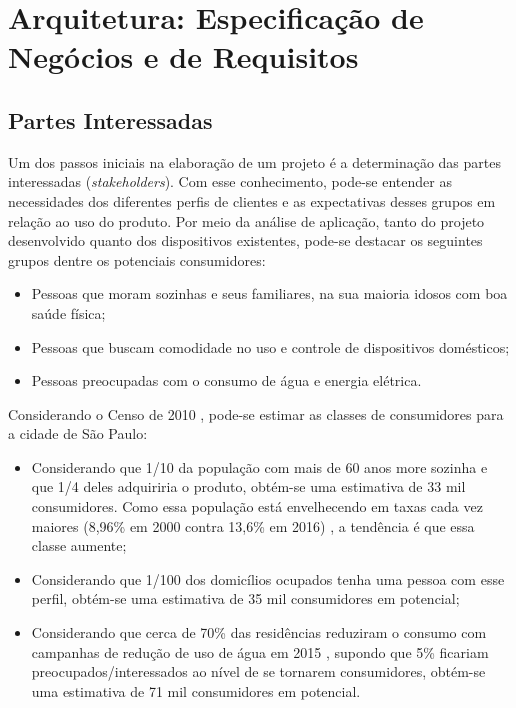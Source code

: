 \chapter{Arquitetura: Especificação de Negócios e de Requisitos}

\section{Partes Interessadas}
Um dos passos iniciais na elaboração de um projeto é a determinação das partes interessadas (\emph{stakeholders}). Com esse conhecimento, pode-se entender as necessidades dos diferentes perfis de clientes e as expectativas desses grupos em relação ao uso do produto. Por meio da análise de aplicação, tanto do projeto desenvolvido quanto dos dispositivos existentes, pode-se destacar os seguintes grupos dentre os potenciais consumidores:

\begin{itemize}
\item Pessoas que moram sozinhas e seus familiares, na sua maioria idosos com boa saúde física;
\item Pessoas que buscam comodidade no uso e controle de dispositivos domésticos;
\item Pessoas preocupadas com o consumo de água e energia elétrica.
\end{itemize}

Considerando o Censo de 2010 \cite{ibge}, pode-se estimar as classes de consumidores para a cidade de São Paulo:

\begin{itemize}
\item Considerando que 1/10 da população com mais de 60 anos more sozinha e que 1/4 deles adquiriria o produto, obtém-se uma estimativa de 33 mil consumidores. Como essa população está envelhecendo em taxas cada vez maiores (8,96\% em 2000 contra 13,6\% em 2016) \cite{bibliotecaVirtual}, a tendência é que essa classe aumente;
\item Considerando que 1/100 dos domicílios ocupados tenha uma pessoa com esse perfil, obtém-se uma estimativa de 35 mil consumidores em potencial;
\item Considerando que cerca de 70\% das residências reduziram o consumo com campanhas de redução de uso de água em 2015 \cite{g1}, supondo que 5\% ficariam preocupados/interessados ao nível de se tornarem consumidores, obtém-se uma estimativa de 71 mil consumidores em potencial.
\end{itemize}


